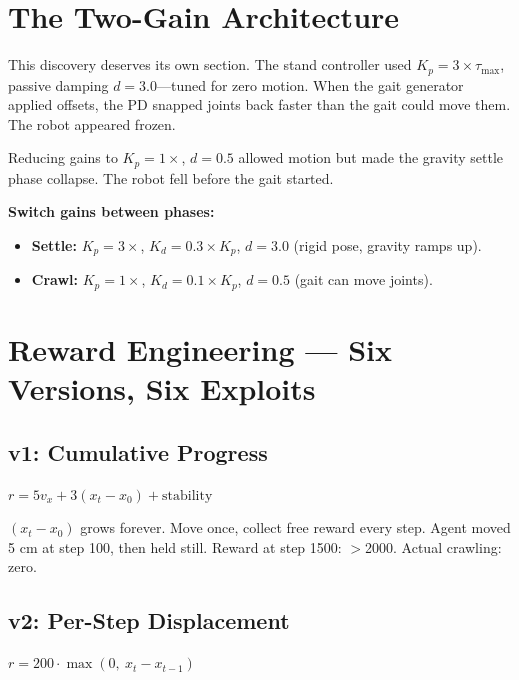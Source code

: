 \documentclass[11pt, a4paper]{article}
\begin{document}
\section{The Two-Gain Architecture}

This discovery deserves its own section. The stand controller used $K_p = 3 \times \tau_{\max}$, passive damping $d = 3.0$---tuned for zero motion. When the gait generator applied offsets, the PD snapped joints back faster than the gait could move them. The robot appeared frozen.

Reducing gains to $K_p = 1\times$, $d = 0.5$ allowed motion but made the gravity settle phase collapse. The robot fell before the gait started.

\begin{fixbox}
\textbf{Switch gains between phases:}
\begin{itemize}[nosep]
\item \textbf{Settle:} $K_p = 3\times$, $K_d = 0.3 \times K_p$, $d = 3.0$ (rigid pose, gravity ramps up).
\item \textbf{Crawl:} $K_p = 1\times$, $K_d = 0.1 \times K_p$, $d = 0.5$ (gait can move joints).
\end{itemize}
\end{fixbox}

\section{Reward Engineering --- Six Versions, Six Exploits}
\label{sec:reward}

\subsection{v1: Cumulative Progress}
$r = 5v_x + 3(x_t - x_0) + \text{stability}$

\begin{failbox}
$(x_t - x_0)$ grows forever. Move once, collect free reward every step. Agent moved 5 cm at step 100, then held still. Reward at step 1500: $>$2000. Actual crawling: zero.
\end{failbox}

\subsection{v2: Per-Step Displacement}
$r = 200 \cdot \max(0,\ x_t - x_{t-1})$
\end{document}
